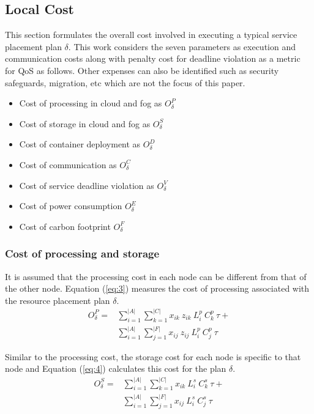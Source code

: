 \documentclass[twocolumn]{article}
\begin{document}
\subsection{Local Cost}\label{subsec:localcost}
\par This section formulates the overall cost involved in executing a typical service placement plan $\delta$. This work considers the seven parameters as execution and communication costs along with penalty cost for deadline violation as a metric for QoS as follows. Other expenses can also be identified such as security safeguards, migration, etc \cite{salaht2020overview} which are not the focus of this paper. 
\begin{itemize}[noitemsep, topsep=4pt]
\item	Cost of processing in cloud and fog as $O^{P}_{\delta}$
\item	Cost of storage in cloud and fog as $O^{S}_{\delta}$
\item	Cost of container deployment as $O^{D}_{\delta}$
\item	Cost of communication as $O^{C}_{\delta}$
\item	Cost of service deadline violation as $O^{V}_{\delta}$
\item 	Cost of power consumption $O^{E}_{\delta}$
\item	Cost of carbon footprint $O^{F}_{\delta}$
\end{itemize}
\nointerlineskip

\subsubsection{Cost of processing and storage}
\par It is assumed that the processing cost in each node can be different from that of the other node. Equation (\ref{eq:3}) measures the cost of processing associated with the resource placement plan $\delta$.
\begin{equation}
\begin{aligned}
O^{P}_{\delta} = &\sum_{i=1}^{|A|}\sum_{k=1}^{|{C}|}x_{ik} \ z_{ik}  \ L_{i}^{p} \ C_{k}^{p} \ \tau + \\
&\sum_{i=1}^{|A|}\sum_{j=1}^{|{F}|}x_{ij} \ z_{ij}  \ L_{i}^{p} \ C_{j}^{p} \ \tau
\end{aligned}
\label{eq:3}
\end{equation}
\par Similar to the processing cost, the storage cost for each node is specific to that node and Equation (\ref{eq:4}) calculates this cost for the plan $\delta$.
\begin{equation}
\begin{aligned}
O^{S}_{\delta} = &\sum_{i=1}^{|A|}\sum_{k=1}^{|{C}|}x_{ik}  \ L_{i}^{s} \ C_{k}^{s} \ \tau + \\
&\sum_{i=1}^{|A|}\sum_{j=1}^{|{F}|}x_{ij} \ L_{i}^{s} \ C_{j}^{s} \ \tau
\end{aligned}
\label{eq:4}
\end{equation}
\end{document}
